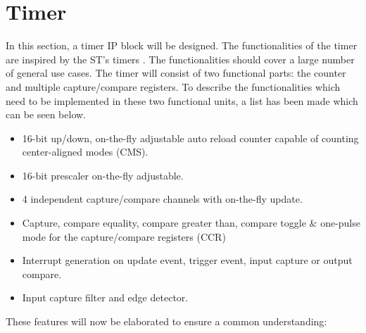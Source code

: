 \documentclass[./dissertation.tex]{subfiles}
\begin{document}
 


  \chapter{Timer}

\label{timer_sec}
In this section, a timer IP block will be designed. The functionalities of the timer are inspired by the ST's timers \cite{TimerManualSTM}. The functionalities should cover a large number of general use cases. The timer will consist of two functional parts: the counter and multiple capture/compare registers. To describe the functionalities which need to be implemented in these two functional units, a list has been made which can be seen below.

\begin{itemize}
    \item 16-bit up/down, on-the-fly adjustable auto reload counter capable of counting center-aligned modes (CMS).
    \item 16-bit prescaler on-the-fly adjustable.
    \item 4 independent capture/compare channels with on-the-fly update.
    \item Capture, compare equality, compare greater than, compare toggle \& one-pulse mode for the capture/compare registers (CCR)
    \item Interrupt generation on update event, trigger event, input capture or output compare.
    \item Input capture filter and edge detector.
\end{itemize}

These features will now be elaborated to ensure a common understanding:
\end{document}
